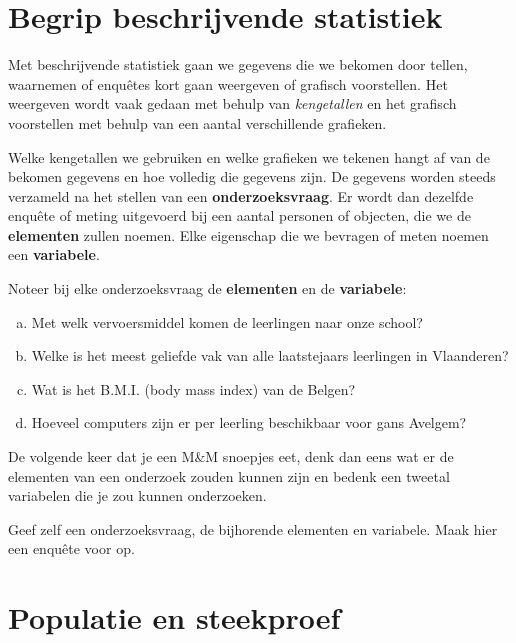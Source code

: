 \documentclass[12pt,twoside]{article}
\begin{document}
\section{Begrip beschrijvende statistiek}

Met beschrijvende statistiek gaan we gegevens die we bekomen door tellen, waarnemen of enquêtes kort gaan weergeven of grafisch voorstellen. Het weergeven wordt vaak gedaan met behulp van {\em kengetallen} en het grafisch voorstellen met behulp van een aantal verschillende grafieken.

Welke kengetallen we gebruiken en welke grafieken we tekenen hangt af van de bekomen gegevens en hoe volledig die gegevens zijn. De gegevens worden steeds verzameld na het stellen van een {\bf onderzoeksvraag}. Er wordt dan dezelfde enquête of meting uitgevoerd bij een aantal personen of objecten, die we de {\bf elementen} zullen noemen. Elke eigenschap die we bevragen of meten noemen een {\bf variabele}.

\begin{oefening}
Noteer bij elke onderzoeksvraag de {\bf elementen} en de {\bf variabele}:
\begin{enumerate}[(a)]
  \item Met welk vervoersmiddel komen de leerlingen naar onze school?
  \item Welke is het meest geliefde vak van alle laatstejaars leerlingen in Vlaanderen?
  \item Wat is het B.M.I. (body mass index) van de Belgen?
  \item Hoeveel computers zijn er per leerling beschikbaar voor gans Avelgem?
\end{enumerate}
\end{oefening}

\begin{oefening}
  De volgende keer dat je een M\&M snoepjes eet, denk dan eens wat er de elementen van een onderzoek zouden kunnen zijn en bedenk een tweetal variabelen die je zou kunnen onderzoeken.
\end{oefening}

\begin{oefening}
Geef zelf een onderzoeksvraag, de bijhorende elementen en variabele. Maak hier een enquête voor op.
\end{oefening}

\pagebreak
\section{Populatie en steekproef}
\end{document}
